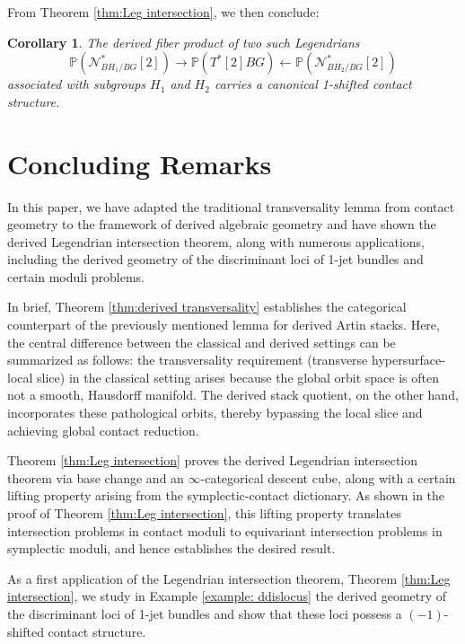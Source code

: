 \documentclass[reqno]{amsart}
\newtheorem{corollary}[theorem]{Corollary}
\theoremstyle{definition}
\theoremstyle{remark}
\begin{document}
{\par From Theorem \ref{thm:Leg intersection}, we then conclude:
\begin{corollary}\label{cor: intersection of prequan}
    The derived fiber product of two such Legendrians $$\mathbb{P}(\mathcal{N}^*_{BH_1/BG}[2]) \to \mathbb{P}(T^*[2]BG) \leftarrow \mathbb{P}(\mathcal{N}^*_{BH_2/BG}[2])$$ associated with subgroups $H_1$ and $H_2$ carries a canonical 1-shifted contact structure.
\end{corollary}
    
 \section{Concluding Remarks}

In this paper, we have adapted the traditional transversality lemma from contact geometry to the framework of derived algebraic geometry and have shown the derived Legendrian intersection theorem, along with numerous applications, including the derived geometry of the discriminant loci of 1-jet bundles and certain moduli problems.

In brief, Theorem \ref{thm:derived transversality} establishes the categorical counterpart of the previously mentioned lemma for derived Artin stacks. Here, the central difference between the classical and derived settings can be summarized as follows: the transversality requirement (transverse hypersurface-local slice) in the classical setting arises because the global orbit space is often not a smooth, Hausdorff manifold. The derived stack quotient, on the other hand, incorporates these pathological orbits, thereby bypassing the local slice and achieving global contact reduction.

Theorem \ref{thm:Leg intersection} proves the derived Legendrian intersection theorem via base change and an $\infty$-categorical descent cube, along with a certain lifting property arising from the symplectic-contact dictionary. As shown in the proof of Theorem \ref{thm:Leg intersection}, this lifting property translates intersection problems in contact
moduli to equivariant intersection problems in symplectic moduli, and hence establishes the desired result. 

As a first application of the Legendrian intersection theorem, Theorem \ref{thm:Leg intersection}, we study in Example \ref{example: ddislocus} the derived geometry of the discriminant loci of 1-jet bundles and show that these loci possess a $(-1)$-shifted contact structure.

}
\end{document}

